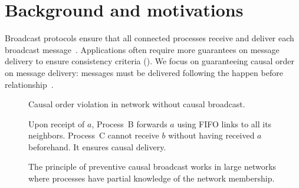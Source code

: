 
\section{Background and motivations}
\label{sec:motivations}

Broadcast protocols ensure that all connected processes receive and deliver each
broadcast message~\cite{hadzilacos1994modular}. Applications often require more
guarantees on message delivery to ensure consistency criteria (\REF). We focus
on guaranteeing causal order on message delivery: messages must be delivered
following the happen before relationship~\cite{lamport1978time}.

\begin{figure*}
  \begin{center}
    \hspace{20pt}
    \hspace{20pt}
    \caption{\label{fig:generalproblem}Causal order violation in network
      without causal broadcast.}
  \end{center}
\end{figure*}


\begin{figure}
  \begin{center}
    
    \caption{\label{fig:generalsolveA} Upon receipt of $a$, Process~B forwards
      $a$ using FIFO links to all its neighbors. Process~C cannot receive $b$
      without having received $a$ beforehand. It ensures causal delivery.}
  \end{center}
\end{figure}

\begin{figure*}
  \begin{center}
    
    \caption{\label{fig:disseminationtree}The principle of preventive causal
      broadcast works in large networks where processes have partial knowledge
      of the network membership.}
  \end{center}
\end{figure*}

